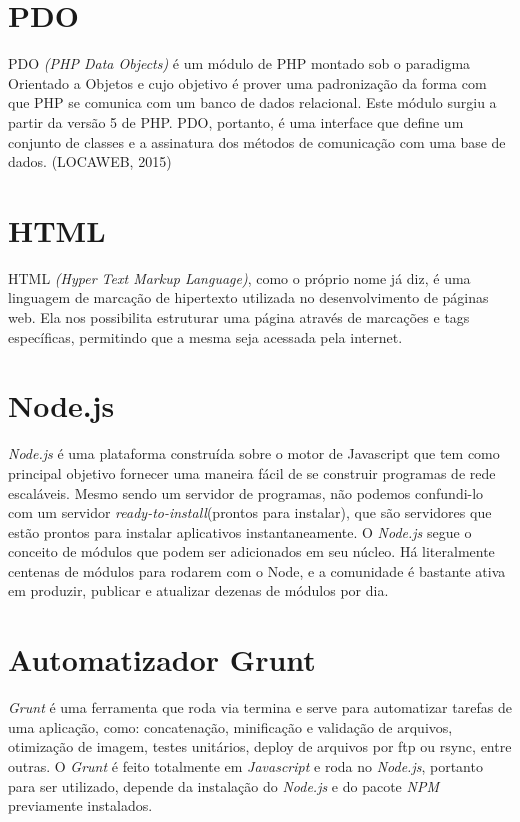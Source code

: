     \section{PDO\label{sec:pdo}}
        PDO \emph{(PHP Data Objects)} é um módulo de PHP montado sob o paradigma Orientado a Objetos e cujo objetivo é prover uma padronização da forma com que PHP se comunica com um banco de dados relacional. Este módulo surgiu a partir da versão 5 de PHP. PDO, portanto, é uma interface que define um conjunto de classes e a assinatura dos métodos de comunicação com uma base de dados. (LOCAWEB, 2015)

    \section{HTML\label{sec:hmtl}}
        HTML \emph{(Hyper Text Markup Language)}, como o próprio nome já diz, é uma linguagem de marcação de hipertexto utilizada no desenvolvimento de páginas web. Ela nos possibilita estruturar uma página através de marcações e tags específicas, permitindo que a mesma seja acessada pela internet.

    \section{Node.js\label{sec:node-js}}
        \emph{Node.js} é uma plataforma construída sobre o motor de Javascript que tem como principal objetivo fornecer uma maneira fácil de se construir programas de rede escaláveis. Mesmo sendo um servidor de programas, não podemos confundi-lo com um servidor \emph{ready-to-install}(prontos para instalar), que são servidores que estão prontos para instalar aplicativos instantaneamente. O \emph{Node.js} segue o conceito de módulos que podem ser adicionados em seu núcleo. Há literalmente centenas de módulos para rodarem com o Node, e a comunidade é bastante ativa em produzir, publicar e atualizar dezenas de módulos por dia.

    \section{Automatizador Grunt\label{sec:automatizador-grunt}}
        \emph{Grunt} é uma ferramenta que roda via termina e serve para automatizar tarefas de uma aplicação,  como: concatenação, minificação e validação de arquivos, otimização de imagem, testes unitários, deploy de arquivos por ftp ou rsync, entre outras. O \emph{Grunt} é feito totalmente em \emph{Javascript} e roda no \emph{Node.js}, portanto para ser utilizado, depende da instalação do \emph{Node.js} e do pacote \emph{NPM} previamente instalados.

